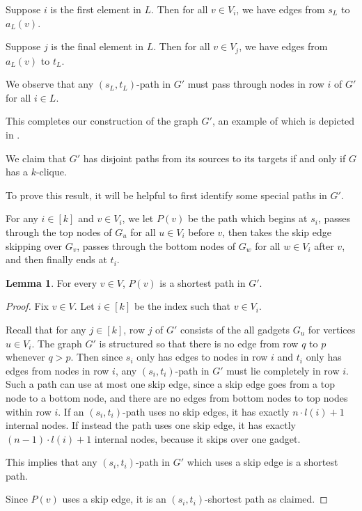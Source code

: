 \documentclass[11pt]{article}
\DeclareMathOperator{\pos}{pos}
\theoremstyle{definition}
\newtheorem{lemma}[theorem]{Lemma}
\begin{document}
    Suppose $i$ is the first element in $L$.
    Then for all $v\in V_i$, we have edges from $s_L$ to $a_L(v)$.

    Suppose $j$ is the final element in $L$.
    Then for all $v\in V_j$, we have edges from $a_L(v)$ to $t_L$.

    We observe that any $(s_L,t_L)$-path in $G'$ must  pass through nodes in row $i$ of $G'$ for all $i\in L$.

    \hfill
    
    This completes our construction of the graph $G'$, an example of which is depicted in .
    
    We claim that $G'$ has disjoint paths from its sources to its targets if and only if $G$ has a $k$-clique.

    To prove this result, it will be helpful to first identify some special paths in $G'$.

    For any $i\in [k]$ and $v\in V_i$, we let $P(v)$ be the path which begins at $s_i$, passes through the top nodes of $G_u$ for all  $u\in V_i$ before $v$, then takes the skip edge skipping over $G_v$, passes through the bottom nodes of $G_w$ for all $w\in V_i$ after $v$, and then finally ends at $t_i$.

    \begin{lemma}
        \label{lem:row-sp}
        For every $v\in V$, $P(v)$ is a shortest path in $G'$.
    \end{lemma}
    \begin{proof}
        Fix $v\in V$.
        Let $i\in [k]$ be the index such that $v\in V_i$.

        Recall that for any $j\in [k]$, row $j$ of $G'$ consists of the all gadgets $G_u$ for vertices $u\in V_i$.
        The graph $G'$ is structured so that there is no edge from row $q$ to $p$ whenever $q > p$.
        Then since $s_i$ only has edges to nodes in row $i$ and $t_i$ only has edges from nodes in row $i$, any $(s_i,t_i)$-path in $G'$ must lie completely in row $i$.
        Such a path can use at most one skip edge, since a skip edge goes from a top node to a bottom node, and there are no edges from bottom nodes to top nodes within row $i$.
        If an $(s_i,t_i)$-path uses no skip edges, it has exactly $n\cdot l(i) + 1$ internal nodes.
        If instead the path uses one skip edge, it has exactly $(n-1)\cdot l(i)+1$ internal nodes, because it skips over one gadget.
        
        This implies that any $(s_i,t_i)$-path in $G'$ which uses a skip edge is a shortest path.
        
        Since $P(v)$ uses a skip edge, it is an $(s_i,t_i)$-shortest path as claimed.
    \end{proof}
        
\end{document}
